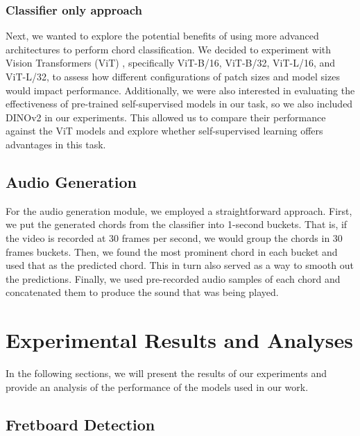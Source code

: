 \documentclass[10pt,twocolumn,letterpaper]{article}
\begin{document}
\subsubsection{Classifier only approach}
Next, we wanted to explore the potential benefits of using more advanced architectures to perform chord classification. We decided to experiment with Vision Transformers (ViT) \cite{dosovitskiy2020image}, specifically ViT-B/16, ViT-B/32, ViT-L/16, and ViT-L/32, to assess how different configurations of patch sizes and model sizes would impact performance. Additionally, we were also interested in evaluating the effectiveness of pre-trained self-supervised models in our task, so we also included DINOv2 \cite{oquab2023dinov2} in our experiments. This allowed us to compare their performance against the ViT models and explore whether self-supervised learning offers advantages in this task.

\subsection{Audio Generation}
For the audio generation module, we employed a straightforward approach. First, we put the generated chords from the classifier into 1-second buckets. That is, if the video is recorded at 30 frames per second, we would group the chords in 30 frames buckets. Then, we found the most prominent chord in each bucket and used that as the predicted chord. This in turn also served as a way to smooth out the predictions. Finally, we used pre-recorded audio samples of each chord and concatenated them to produce the sound that was being played.

\section{Experimental Results and Analyses}
\label{sec:results}

In the following sections, we will present the results of our experiments and provide an analysis of the performance of the models used in our work.

\subsection{Fretboard Detection}
\end{document}
